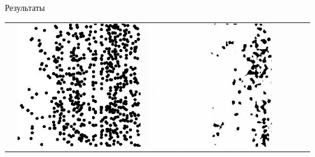 \documentclass[12pt]{beamer}
\begin{document}
\begin{frame}{Результаты}
\begin{table}
\begin{center}
\begin{tabular}{p{1.2cm} p{1.2cm} p{1.2cm} p{1.2cm} p{1.2cm} p{1.2cm} p{1.2cm}}
					&
					\includegraphics[width=1\linewidth]{8-results/sand-trend2/pan1}
					&
					\includegraphics[width=1\linewidth]{8-results/sand-trend2/nf8/gen1}
					&

\end{tabular}
\end{center}
\end{table}
\end{frame}
\end{document}
